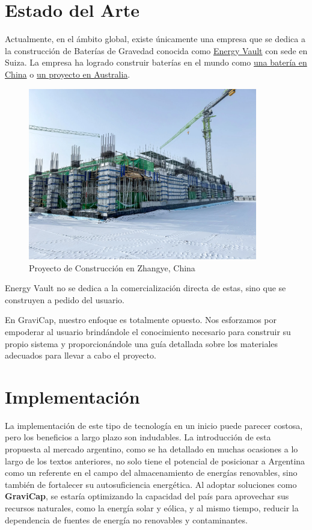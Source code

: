         \section{Estado del Arte}
            Actualmente, en el ámbito global, existe únicamente una empresa que se dedica a la construcción de Baterías de Gravedad conocida como \href{https://www.energyvault.com}{Energy Vault} con sede en Suiza. La empresa ha logrado construir baterías en el mundo como \href{https://www.energyvault.com/projects/zhangye}{una batería en China} o \href{https://www.renewableenergyworld.com/storage/energy-vault-lands-partnership-for-building-based-gravity-storage/}{un proyecto en Australia}.\par
            \begin{figure} [ht]
                \centering
                \includegraphics [width=10cm]{Introducción/Zhangye.png}
                \caption{Proyecto de Construcción en Zhangye, China}
                \label{fig:Zhangye}
            \end{figure}
            Energy Vault no se dedica a la comercialización directa de estas, sino que se construyen a pedido del usuario.\par
            En \textcolor{dark_violet}{GraviCap}, nuestro enfoque es totalmente opuesto. Nos esforzamos por empoderar al usuario brindándole el conocimiento necesario para construir su propio sistema y proporcionándole una guía detallada sobre los materiales adecuados para llevar a cabo el proyecto.\par

        \section{Implementación}
            La implementación de este tipo de tecnología en un inicio puede parecer costosa, pero los beneficios a largo plazo son indudables. La introducción de esta propuesta al mercado argentino, como se ha detallado en muchas ocasiones a lo largo de los textos anteriores, no solo tiene el potencial de posicionar a Argentina como un referente en el campo del almacenamiento de energías renovables, sino también de fortalecer su autosuficiencia energética. Al adoptar soluciones como \textcolor{dark_violet}{\textbf{GraviCap}}, se estaría optimizando la capacidad del país para aprovechar sus recursos naturales, como la energía solar y eólica, y al mismo tiempo, reducir la dependencia de fuentes de energía no renovables y contaminantes.\par
        
